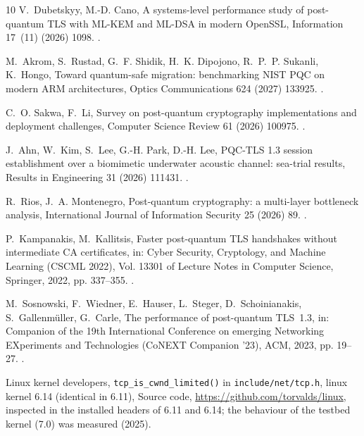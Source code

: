 \documentclass[preprint,12pt]{elsarticle}
\begin{document}
\begin{thebibliography}{10}
V.~Dubetskyy, M.-D. Cano, A systems-level performance study of post-quantum {TLS}
  with {ML-KEM} and {ML-DSA} in modern {OpenSSL}, Information 17~(11) (2026)
  1098.
\newblock \href {https://doi.org/10.3390/info17111098}
  {}.

M.~Akrom, S.~Rustad, G.~F. Shidik, H.~K. Dipojono, R.~P.~P. Sukanli,
  K.~Hongo, Toward quantum-safe migration: benchmarking {NIST} {PQC} on modern
  {ARM} architectures, Optics Communications 624 (2027) 133925.
\newblock \href {https://doi.org/10.1016/j.optcom.2026.133925}
  {}.

C.~O. Sakwa, F.~Li, Survey on post-quantum cryptography implementations and
  deployment challenges, Computer Science Review 61 (2026) 100975.
\newblock \href {https://doi.org/10.1016/j.cosrev.2026.100975}
  {}.

J.~Ahn, W.~Kim, S.~Lee, G.-H. Park, D.-H. Lee, {PQC-TLS} 1.3 session
  establishment over a biomimetic underwater acoustic channel: sea-trial
  results, Results in Engineering 31 (2026) 111431.
\newblock \href {https://doi.org/10.1016/j.rineng.2026.111431}
  {}.

R.~Rios, J.~A. Montenegro, Post-quantum cryptography: a multi-layer bottleneck
  analysis, International Journal of Information Security 25 (2026) 89.
\newblock \href {https://doi.org/10.1007/s10207-026-01242-0}
  {}.

P.~Kampanakis, M.~Kallitsis, Faster post-quantum {TLS} handshakes without
  intermediate {CA} certificates, in: Cyber Security, Cryptology, and Machine
  Learning (CSCML 2022), Vol. 13301 of Lecture Notes in Computer Science,
  Springer, 2022, pp. 337--355.
\newblock \href {https://doi.org/10.1007/978-3-031-07689-3_25}
  {}.

M.~Sosnowski, F.~Wiedner, E.~Hauser, L.~Steger, D.~Schoinianakis,
  S.~Gallenm{\"u}ller, G.~Carle, The performance of post-quantum {TLS}~1.3, in:
  Companion of the 19th International Conference on emerging Networking
  EXperiments and Technologies (CoNEXT Companion '23), ACM, 2023, pp. 19--27.
\newblock \href {https://doi.org/10.1145/3624354.3630585}
  {}.

{Linux kernel developers}, {\texttt{tcp\_is\_cwnd\_limited()}} in
  \texttt{include/net/tcp.h}, linux kernel 6.14 (identical in 6.11), Source
  code, \url{https://github.com/torvalds/linux}, inspected in the installed
  headers of 6.11 and 6.14; the behaviour of the testbed kernel (7.0) was
  measured (2025).


\end{thebibliography}
\end{document}
